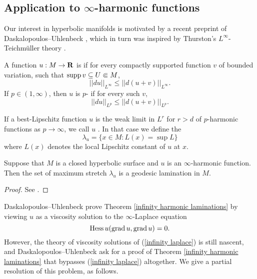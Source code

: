 
\subsection{Application to \texorpdfstring{$\infty$}{infinity}-harmonic functions}
Our interest in hyperbolic manifolds is motivated by a recent preprint of Daskalopoulos--Uhlenbeck \cite{daskalopoulos2020transverse}, which in turn was inspired by Thurston's $L^\infty$-Teichm\"uller theory \cite{thurston1998minimal}.

\begin{definition}
A function $u: M \to \mathbf{R}$ is  if for every compactly supported function $v$ of bounded variation, such that $\operatorname{supp} v \subseteq U \Subset M$,
$$||du||_{L^\infty} \leq ||d(u + v)||_{L^\infty}.$$
If $p \in (1, \infty)$, then $u$ is $p$- if for every such $v$,
$$||du||_{L^p} \leq ||d(u + v)||_{L^p}.$$
\end{definition}

\begin{definition}
If a best-Lipschitz function $u$ is the weak limit in $L^r$ for $r > d$ of $p$-harmonic functions as $p \to \infty$, we call $u$ .
In that case we define the 
$$\lambda_u = \{x \in M: L(x) = \sup L\}$$
where $L(x)$ denotes the local Lipschitz constant of $u$ at $x$.
\end{definition}

\begin{theorem}\label{infinity harmonic laminations}
Suppose that $M$ is a closed hyperbolic surface and $u$ is an $\infty$-harmonic function. Then the set of maximum stretch $\lambda_u$ is a geodesic lamination in $M$.
\end{theorem}
\begin{proof}
See \cite[\S5]{daskalopoulos2020transverse}.
\end{proof}

Daskalopoulos--Uhlenbeck prove Theorem \ref{infinity harmonic laminations} by viewing $u$ as a viscosity solution to the $\infty$-Laplace equation 
\begin{equation}\label{infinity laplace}
    \operatorname{Hess} u(\operatorname{grad} u, \operatorname{grad} u) = 0.
\end{equation}
However, the theory of viscosity solutions of (\ref{infinity laplace}) \cite{Aronsson1984} \cite{Evans08} is still nascent, and Daskalopoulos--Uhlenbeck ask for a proof of Theorem \ref{infinity harmonic laminations} that bypasses (\ref{infinity laplace}) altogether.
We give a partial resolution of this problem, as follows.

